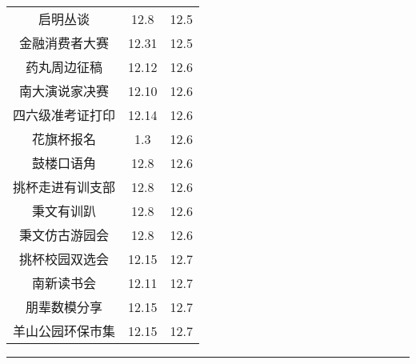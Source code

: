 \documentclass[letterpaper, 12pt]{article}
\begin{document}
\begin{multicols}{2}
{\begin{longtable}{|c|c|c|}
    启明丛谈 & 12.8 & 12.5\\
    金融消费者大赛 & 12.31 & 12.5\\
    药丸周边征稿 & 12.12 & 12.6\\
    南大演说家决赛 & 12.10 & 12.6\\
    四六级准考证打印 & 12.14 & 12.6\\
    花旗杯报名 & 1.3 & 12.6\\
    鼓楼口语角 & 12.8 & 12.6\\
    挑杯走进有训支部 & 12.8 & 12.6\\
    秉文有训趴 & 12.8 & 12.6\\
    秉文仿古游园会 & 12.8 & 12.6\\
    挑杯校园双选会 & 12.15 & 12.7\\
    南新读书会 & 12.11 & 12.7\\
    朋辈数模分享 & 12.15 & 12.7\\
    羊山公园环保市集 & 12.15 & 12.7\\
    
    \hline
\end{longtable}
\unskip
\unpenalty
\unpenalty}\unvbox\colbbox
\end{multicols}
\hrule
\pagebreak
\end{document}
